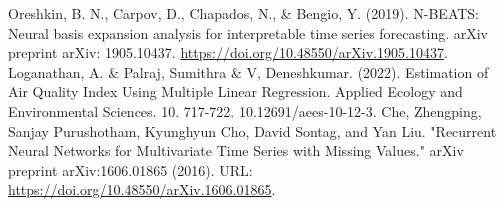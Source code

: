 \documentclass[conference]{IEEEtran}
\begin{document}
\begin{thebibliography}{00}
     Oreshkin, B. N., Carpov, D., Chapados, N., \& Bengio, Y. (2019). N-BEATS: Neural basis expansion analysis for interpretable time series forecasting. arXiv preprint arXiv: 1905.10437. \url{https://doi.org/10.48550/arXiv.1905.10437}.
     Loganathan, A. \& Palraj, Sumithra \& V, Deneshkumar. (2022). Estimation of Air Quality Index Using Multiple Linear Regression. Applied Ecology and Environmental Sciences. 10. 717-722. 10.12691/aees-10-12-3.
    Che, Zhengping, Sanjay Purushotham, Kyunghyun Cho, David Sontag, and Yan Liu.
    "Recurrent Neural Networks for Multivariate Time Series with Missing Values."
    arXiv preprint arXiv:1606.01865 (2016).
    URL: \url{https://doi.org/10.48550/arXiv.1606.01865}.
\end{thebibliography}
\end{document}
